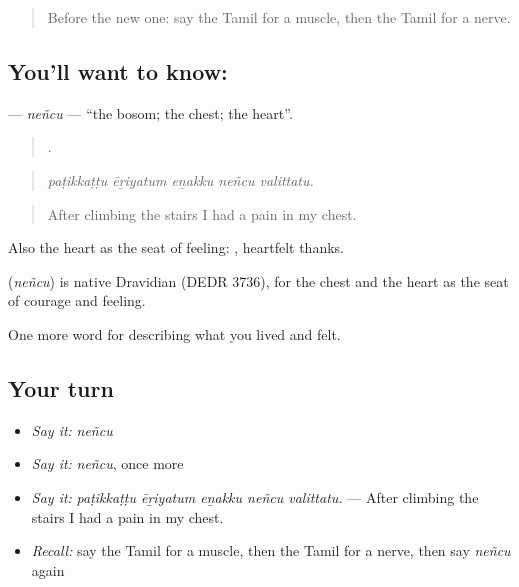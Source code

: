 \label{lesson:TA-C479-nencu}



\begin{quote}
Before the new one: say the Tamil for a muscle, then the Tamil for a nerve.
\end{quote}

\subsection*{You'll want to know: }
\textbf{} — \emph{neñcu} — \textquotedblleft{}the bosom; the chest; the heart\textquotedblright{}.

\begin{quote}
    .
\end{quote}

\begin{quote}
\emph{paṭikkaṭṭu ēṟiyatum eṉakku neñcu valittatu.}
\end{quote}

\begin{quote}
After climbing the stairs I had a pain in my chest.
\end{quote}

Also the heart as the seat of feeling:   , heartfelt thanks.

\begin{cousinweb}
\textbf{} (\emph{neñcu}) is native Dravidian (DEDR 3736), for the chest and the heart as the seat of courage and feeling.
\end{cousinweb}

\begin{grammarlens}[title={What you've built}]
One more word for describing what you lived and felt.
\end{grammarlens}

\subsection*{Your turn}
\begin{itemize}
\raggedright
  \item \emph{Say it:} \emph{neñcu}
  \item \emph{Say it:} \emph{neñcu}, once more
  \item \emph{Say it:} \emph{paṭikkaṭṭu ēṟiyatum eṉakku neñcu valittatu.} — After climbing the stairs I had a pain in my chest.
  \item \emph{Recall:} say the Tamil for a muscle, then the Tamil for a nerve, then say \emph{neñcu} again
\end{itemize}

